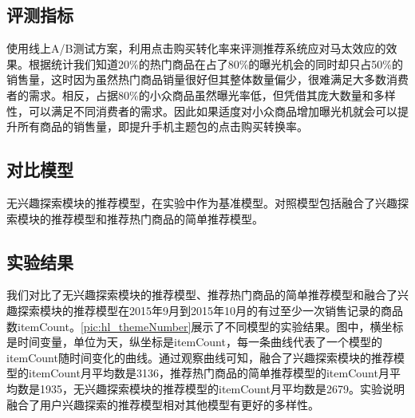   \subsection{评测指标}
  使用线上A/B测试方案，利用点击购买转化率来评测推荐系统应对马太效应的效果。根据统计我们知道20\%的热门商品在占了80\%的曝光机会的同时却只占50\%的销售量，这时因为虽然热门商品销量很好但其整体数量偏少，很难满足大多数消费者的需求。相反，占据80\%的小众商品虽然曝光率低，但凭借其庞大数量和多样性，可以满足不同消费者的需求。因此如果适度对小众商品增加曝光机就会可以提升所有商品的销售量，即提升手机主题包的点击购买转换率。
  \subsection{对比模型}
  无兴趣探索模块的推荐模型，在实验中作为基准模型。对照模型包括融合了兴趣探索模块的推荐模型和推荐热门商品的简单推荐模型。
  \subsection{实验结果}
  我们对比了无兴趣探索模块的推荐模型、推荐热门商品的简单推荐模型和融合了兴趣探索模块的推荐模型在2015年9月到2015年10月的有过至少一次销售记录的商品数itemCount。\autoref{pic:hl_themeNumber}展示了不同模型的实验结果。图中，横坐标是时间变量，单位为天，纵坐标是itemCount，每一条曲线代表了一个模型的itemCount随时间变化的曲线。通过观察曲线可知，融合了兴趣探索模块的推荐模型的itemCount月平均数是3136，推荐热门商品的简单推荐模型的itemCount月平均数是1935，无兴趣探索模块的推荐模型的itemCount月平均数是2679。实验说明融合了用户兴趣探索的推荐模型相对其他模型有更好的多样性。
  \begin{figure}
  \centering
    \label{pic:hl_themeNumber}
  \end{figure}

